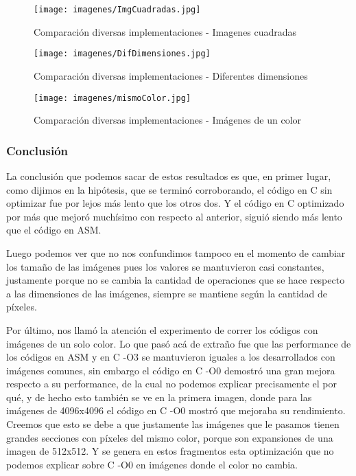 \begin{figure}[h!]
\centering
\captionsetup{justification=centering}
	\texttt{[image: imagenes/ImgCuadradas.jpg]}
	\caption[center]{Comparación diversas implementaciones - Imagenes cuadradas}
\end{figure}

\medskip
\begin{figure}[h!]
\centering
\captionsetup{justification=centering}
	\texttt{[image: imagenes/DifDimensiones.jpg]}
	\caption[center]{Comparación diversas implementaciones - Diferentes dimensiones }
\end{figure}

\medskip

\begin{figure}[h!]
\centering
\captionsetup{justification=centering}
	\texttt{[image: imagenes/mismoColor.jpg]}
	\caption[center]{Comparación diversas implementaciones - Imágenes de un color}
\end{figure}

\subsubsection{Conclusión}
\par{La conclusión que podemos sacar de estos resultados es que, en primer lugar, como dijimos en la hipótesis, que se terminó corroborando, el código en C sin optimizar fue por lejos más lento que los otros dos. Y el código en C optimizado por más que mejoró muchísimo con respecto al anterior, siguió siendo más lento que el código en ASM.}
\par{Luego podemos ver que no nos confundimos tampoco en el momento de cambiar los tamaño de las imágenes pues los valores se mantuvieron casi constantes, justamente porque no se cambia la cantidad de operaciones que se hace respecto a las dimensiones de las imágenes, siempre se mantiene según la cantidad de píxeles.}
\par{Por último, nos llamó la atención el experimento de correr los códigos con imágenes de un solo color. Lo que pasó acá de extraño fue que las performance de los códigos en ASM y en C -O3 se mantuvieron iguales a los desarrollados con imágenes comunes, sin embargo el código en C -O0 demostró una gran mejora respecto a su performance, de la cual no podemos explicar precisamente el por qué, y de hecho esto también se ve en la primera imagen, donde para las imágenes de 4096x4096 el código en C -O0 mostró que mejoraba su rendimiento. Creemos que esto se debe a que justamente las imágenes que le pasamos tienen grandes secciones con píxeles del mismo color, porque son expansiones de una imagen de 512x512. Y se genera en estos fragmentos esta optimización que no podemos explicar sobre C -O0 en imágenes donde el color no cambia.}
	

